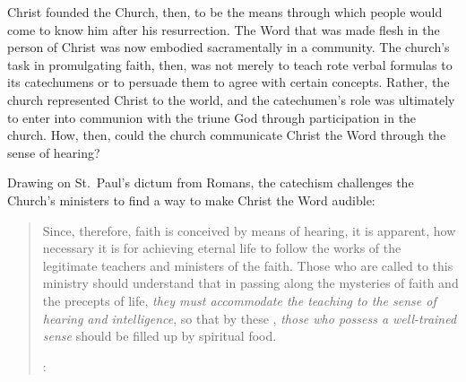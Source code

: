 Christ founded the Church, then, to be the means through which people would come to know him after his resurrection.
The Word that was made flesh in the person of Christ was now embodied sacramentally in a community.
The church's task in promulgating faith, then, was not merely to teach rote verbal formulas to its catechumens or to persuade them to agree with certain concepts.
Rather, the church represented Christ to the world, and the catechumen's role was ultimately to enter into communion with the triune God through participation in the church.
How, then, could the church communicate Christ the Word through the sense of hearing?

Drawing on St.\ Paul's dictum from Romans, the catechism challenges the Church's ministers to find a way to make Christ the Word audible:
\begin{quote}
  Since, therefore, faith is conceived by means of hearing, it is apparent, how necessary it is for achieving eternal life to follow the works of the legitimate teachers and ministers of the faith. \Dots{}
  Those who are called to this ministry should understand that in passing along the mysteries of faith and the precepts of life, \emph{they must accommodate the teaching to the sense of hearing and intelligence}, so that by these , \emph{those who possess a well-trained sense} should be filled up by spiritual food.%
  \begin{Footnote}
    \Autocite[2, 8--9 (emphasis added)]{Catholic:Catechismus1614}: 
  \end{Footnote}
\end{quote}

